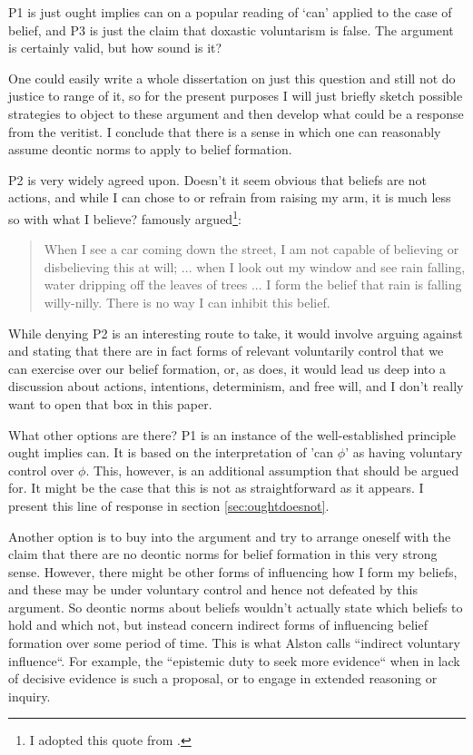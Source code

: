 \documentclass[12pt,numbers=noenddot]{scrartcl}
\begin{document}
P1 is just ought implies can on a popular reading of ‘can’ applied to the case of belief, and P3 is just the claim that doxastic voluntarism is false. The argument is certainly valid, but how sound is it?

One could easily write a whole dissertation on just this question and still not do justice to range of it, so for the present purposes I will just briefly sketch possible strategies to object to these argument and then develop what could be a response from the veritist. I conclude that there is a sense in which one can reasonably assume deontic norms to apply to belief formation.

P2 is very widely agreed upon. Doesn't it seem obvious that beliefs are not actions, and while I can chose to or refrain from raising my arm, it is much less so with what I believe? \textcite[91]{Alston1989} famously argued\footnote{I adopted this quote from \textcite{Steup2000-STEDVA}.}:

\begin{quote}
    When I see a car coming down the street, I am not capable of believing or disbelieving this at will; ... when I look out my window and see rain falling, water dripping off the leaves of trees ... I form the belief that rain is falling willy-nilly. There is no way I can inhibit this belief.
\end{quote}

While denying P2 is an interesting route to take, it would involve arguing against \textcite{Alston1988-ALSTDC} and stating that there are in fact forms of relevant voluntarily control that we can exercise over our belief formation, or, as \textcite{Steup2000-STEDVA} does, it would lead us deep into a discussion about actions, intentions, determinism, and free will, and I don't really want to open that box in this paper. 

What other options are there? P1 is an instance of the well-established principle ought implies can. It is based on the interpretation of 'can $\phi$' as having voluntary control over $\phi$. This, however, is an additional assumption that should be argued for. It might be the case that this is not as straightforward as it appears. I present this line of response in section \ref{sec:oughtdoesnot}.

Another option is to buy into the argument and try to arrange oneself with the claim that there are no deontic norms for belief formation in this very strong sense. However, there might be other forms of influencing how I form my beliefs, and these may be under voluntary control and hence not defeated by this argument. So deontic norms about beliefs wouldn't actually state which beliefs to hold and which not, but instead concern indirect forms of influencing belief formation over some period of time. This is what Alston calls “indirect voluntary influence“. For example, the “epistemic duty to seek more evidence“ \textcite{Hall1998-HALTED-2} when in lack of decisive evidence is such a proposal, or to engage in extended reasoning or inquiry.
\end{document}
